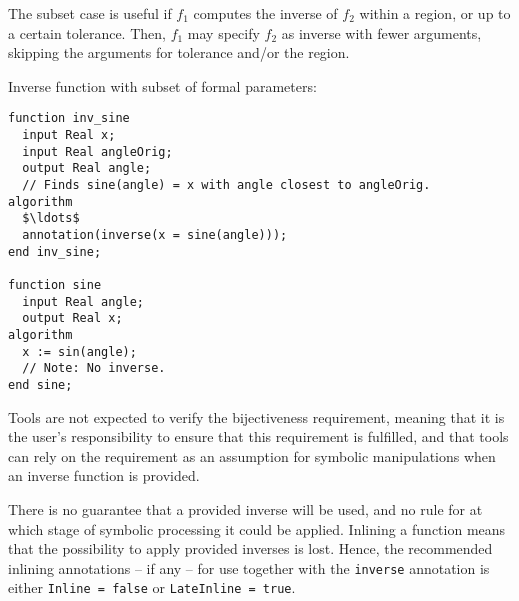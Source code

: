 The subset case is useful if $f_1$ computes the inverse of $f_2$ within a region, or up to a certain tolerance.
Then, $f_1$ may specify $f_2$ as inverse with fewer arguments, skipping the arguments for tolerance and/or the region.

\begin{example}
Inverse function with subset of formal parameters:
\begin{lstlisting}[language=modelica]
function inv_sine
  input Real x;
  input Real angleOrig;
  output Real angle;
  // Finds sine(angle) = x with angle closest to angleOrig.
algorithm
  $\ldots$
  annotation(inverse(x = sine(angle)));
end inv_sine;

function sine
  input Real angle;
  output Real x;
algorithm
  x := sin(angle);
  // Note: No inverse.
end sine;
\end{lstlisting}
\end{example}

Tools are not expected to verify the bijectiveness requirement, meaning that it is the user's responsibility to ensure that this requirement is fulfilled, and that tools can rely on the requirement as an assumption for symbolic manipulations when an inverse function is provided.

There is no guarantee that a provided inverse will be used, and no rule for at which stage of symbolic processing it could be applied.
Inlining a function means that the possibility to apply provided inverses is lost.
Hence, the recommended inlining annotations -- if any -- for use together with the {\lstinline!inverse!} annotation is either {\lstinline!Inline = false!} or {\lstinline!LateInline = true!}.

